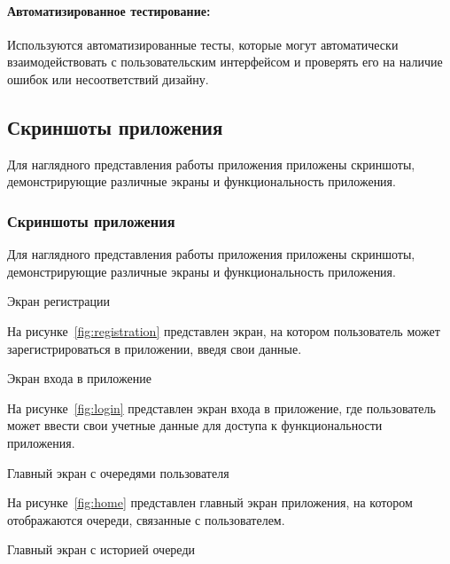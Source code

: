 \paragraph{Автоматизированное тестирование:} Используются автоматизированные
тесты, которые могут автоматически взаимодействовать
с пользовательским интерфейсом и проверять его на наличие ошибок
или несоответствий дизайну.

\subsection{Скриншоты приложения}

Для наглядного представления работы приложения приложены скриншоты,
демонстрирующие различные экраны и функциональность приложения. 

\subsubsection{Скриншоты приложения}

Для наглядного представления работы приложения приложены скриншоты, демонстрирующие различные экраны и функциональность приложения.

\begin{image}
    \caption{Экран регистрации}
    \label{fig:registration}
\end{image}

На рисунке~\ref{fig:registration} представлен экран,
на котором пользователь может зарегистрироваться в приложении,
введя свои данные.

\begin{image}
    \caption{Экран входа в приложение}
    \label{fig:login}
\end{image}

На рисунке~\ref{fig:login} представлен экран входа в приложение,
где пользователь может ввести свои учетные данные для доступа
к функциональности приложения.

\begin{image}
    \caption{Главный экран с очередями пользователя}
    \label{fig:home}
\end{image}

На рисунке~\ref{fig:home} представлен главный экран приложения,
на котором отображаются очереди, связанные с пользователем.

\begin{image}
    \caption{Главный экран с историей очереди}
    \label{fig:home:history}
\end{image}

